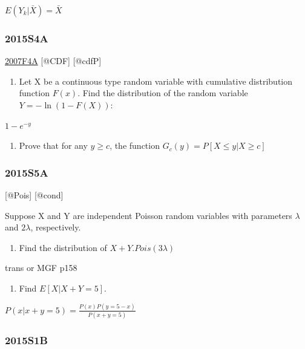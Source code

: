 \documentclass[6pt,Portrait]{article}
\providecommand{\tightlist}{%
  \setlength{\itemsep}{0pt}\setlength{\parskip}{0pt}}
\begin{document}
\(E(Y_k|\bar X)=\bar X\)

\hypertarget{s4a-1}{%
\subsubsection{2015S4A}\label{s4a-1}}

\protect\hyperlink{f4a}{2007F4A} {[}@CDF{]} {[}@cdfP{]}

\begin{enumerate}
\def\labelenumi{(\alph{enumi})}
\tightlist
\item
  Let X be a continuous type random variable with cumulative
  distribution function \(F(x)\). Find the distribution of the random
  variable \(Y=-\ln(1-F(X))\):
\end{enumerate}

\(1-e^{-y}\)

\begin{enumerate}
\def\labelenumi{(\alph{enumi})}
\setcounter{enumi}{1}
\tightlist
\item
  Prove that for any \(y\ge c\), the function
  \(G_c(y)=P[X\le y|X\ge c]\)
\end{enumerate}

\hypertarget{s5a-1}{%
\subsubsection{2015S5A}\label{s5a-1}}

{[}@Pois{]} {[}@cond{]}

Suppose X and Y are independent Poisson random variables with parameters
\(\lambda\) and \(2\lambda\), respectively.

\begin{enumerate}
\def\labelenumi{(\alph{enumi})}
\tightlist
\item
  Find the distribution of \(X+Y\).\(Pois(3\lambda)\)
\end{enumerate}

trans or MGF p158

\begin{enumerate}
\def\labelenumi{(\alph{enumi})}
\setcounter{enumi}{1}
\tightlist
\item
  Find \(E[X|X+Y=5]\).
\end{enumerate}

\(P(x|x+y=5)=\frac{P(x)P(y=5-x)}{P(x+y=5)}\)

\hypertarget{s1b-1}{%
\subsubsection{2015S1B}\label{s1b-1}}
\end{document}
